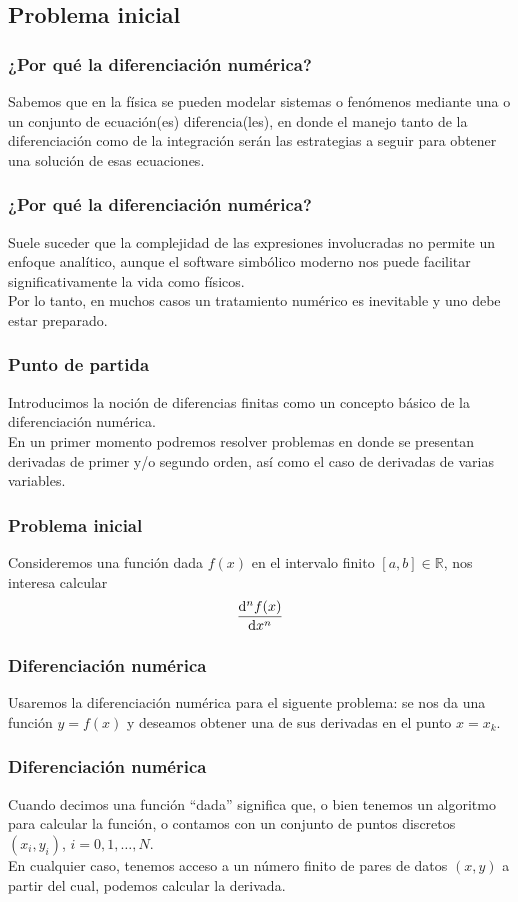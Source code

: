 \subsection{Problema inicial}
\begin{frame}
\frametitle{¿Por qué la diferenciación numérica?}
Sabemos que en la física se pueden modelar sistemas o fenómenos mediante una o un conjunto de ecuación(es) diferencia(les), en donde el manejo tanto de la diferenciación como de la integración serán las estrategias a seguir para obtener una solución de esas ecuaciones.
\end{frame}
\begin{frame}
\frametitle{¿Por qué la diferenciación numérica?}
Suele suceder que la complejidad de las expresiones involucradas no permite un enfoque analítico, aunque el software simbólico moderno nos puede facilitar significativamente la vida como físicos.
\\
\bigskip
Por lo tanto, en muchos casos un tratamiento numérico es inevitable y uno debe estar preparado.
\end{frame}
\begin{frame}
\frametitle{Punto de partida}
Introducimos la noción de diferencias finitas como un concepto básico de la diferenciación numérica.
\\
\bigskip
En un primer momento podremos resolver problemas en donde se presentan derivadas de primer y/o segundo orden, así como el caso de derivadas de varias variables.
\end{frame}
\begin{frame}
\frametitle{Problema inicial}
Consideremos una función dada $f(x)$ en el intervalo finito $[a, b] \in \mathbb{R}$, nos interesa calcular
\begin{align*}
\dv[n]{f(x)}{x}
\end{align*}
\end{frame}
\begin{frame}
\frametitle{Diferenciación numérica}
Usaremos la diferenciación numérica para el siguente problema: se nos da una función $y = f(x)$ y deseamos obtener una de sus derivadas en el punto $x = x_{k}$.
\end{frame}
\begin{frame}
\frametitle{Diferenciación numérica}
Cuando decimos una función \enquote{dada} significa que, o bien tenemos un algoritmo para calcular la función, o contamos con un conjunto de puntos discretos $(x_{i}, y_{i})$, $i = 0, 1,\ldots,N$.
\\
\bigskip
En cualquier caso, tenemos acceso a un número finito de pares de datos $(x, y)$ a partir del cual, podemos calcular la derivada.
\end{frame}
